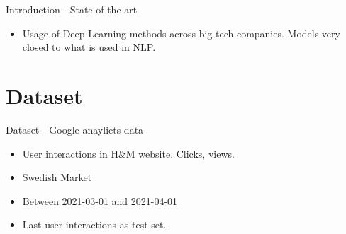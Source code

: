 \documentclass{beamer}
\begin{document}
\begin{frame}{Introduction - State of the art}
\begin{figure}[!htb]
\endminipage
\end{figure}
\begin{itemize}
\item Usage of Deep Learning methods across big tech companies. Models very closed to what is used in NLP.
\end{itemize} 

\end{frame}

\section{Dataset}
\begin{frame}{Dataset - Google anaylicts data}
\begin{itemize}
    \item User interactions in H\&M website. Clicks, views.
    \item Swedish Market
    \item Between 2021-03-01 and 2021-04-01
    \item Last user interactions as test set.
\end{itemize}
\end{frame}
\end{document}
